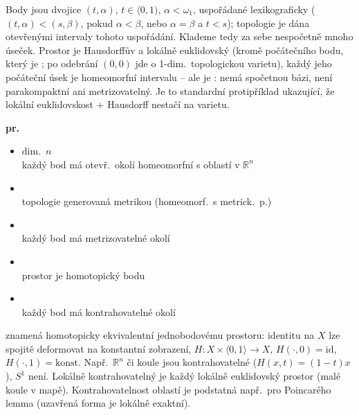 \begin{vysvetleni}
Body jsou dvojice $(t,\alpha)$, $t\in\langle 0,1)$, $\alpha<\omega_1$, uspořádané lexikograficky ($(t,\alpha)<(s,\beta)$, pokud $\alpha<\beta$, nebo $\alpha=\beta$ a $t<s$); topologie je dána otevřenými intervaly tohoto uspořádání. Klademe tedy za sebe nespočetně mnoho úseček. Prostor je Hausdorffův a lokálně euklidovský (kromě počátečního bodu, který je ; po odebrání $(0,0)$ jde o 1-dim.\ topologickou varietu), každý jeho počáteční úsek je homeomorfní intervalu -- ale je : nemá spočetnou bázi, není parakompaktní ani metrizovatelný. Je to standardní protipříklad ukazující, že lokální euklidovskost + Hausdorff nestačí na  varietu.
\end{vysvetleni}

\textbf{ pr.}
\begin{itemize}
  \item {} dim.\ $n$ \\
        každý bod má otevř.\ okolí homeomorfní s oblastí v $\mathbb{R}^n$
  \item {} \\
        topologie generovaná metrikou (homeomorf.\ s metrick.\ p.)
  \item {} \\
        každý bod má metrizovatelné okolí
  \item {} \\
        prostor je homotopický bodu
  \item {} \\
        každý bod má kontrahovatelné okolí
\end{itemize}

\begin{vysvetleni}[Kontrahovatelnost]
 znamená homotopicky ekvivalentní jednobodovému prostoru: identitu na $X$ lze spojitě deformovat na konstantní zobrazení, $H:X\times\langle0,1\rangle\to X$, $H(\cdot,0)=\mathrm{id}$, $H(\cdot,1)=\text{konst}$. Např.\ $\mathbb{R}^n$ či koule jsou kontrahovatelné ($H(x,t)=(1-t)x$), $S^1$ není. Lokálně kontrahovatelný je každý lokálně euklidovský prostor (malé koule v mapě). Kontrahovatelnost oblastí je podstatná např.\ pro Poincarého lemma (uzavřená forma je lokálně exaktní).
\end{vysvetleni}


